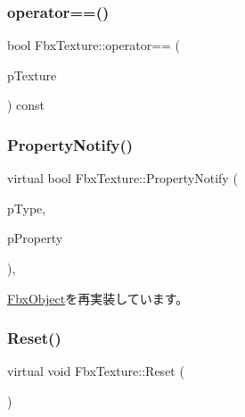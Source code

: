\mbox{\label{class_fbx_texture_a65138a2a6eb3226ea7d3f0e9384c23a4}} 
\subsubsection{\texorpdfstring{operator==()}{operator==()}}
{\footnotesize\ttfamily bool Fbx\+Texture\+::operator== (\begin{DoxyParamCaption}\item[{\hyperlink{class_fbx_texture}{Fbx\+Texture} const \&}]{p\+Texture }\end{DoxyParamCaption}) const}

\mbox{\label{class_fbx_texture_af45140c7eecc9b2e133d7ee8a63fd5f5}} 
\subsubsection{\texorpdfstring{Property\+Notify()}{PropertyNotify()}}
{\footnotesize\ttfamily virtual bool Fbx\+Texture\+::\+Property\+Notify (\begin{DoxyParamCaption}\item[{\hyperlink{class_fbx_object_a528f1b2c2b7abbd64c525ba3a9a496b8}{E\+Property\+Notify\+Type}}]{p\+Type,  }\item[{\hyperlink{class_fbx_property}{Fbx\+Property} \&}]{p\+Property }\end{DoxyParamCaption})\hspace{0.3cm}{\ttfamily [protected]}, {\ttfamily [virtual]}}



\hyperlink{class_fbx_object_a68b9ad65d98d7be9cb252949bc709385}{Fbx\+Object}を再実装しています。

\mbox{\label{class_fbx_texture_a9ba254e02e13f1cae91295c996ed7fcb}} 
\subsubsection{\texorpdfstring{Reset()}{Reset()}}
{\footnotesize\ttfamily virtual void Fbx\+Texture\+::\+Reset (\begin{DoxyParamCaption}{ }\end{DoxyParamCaption})\hspace{0.3cm}{\ttfamily [virtual]}}

